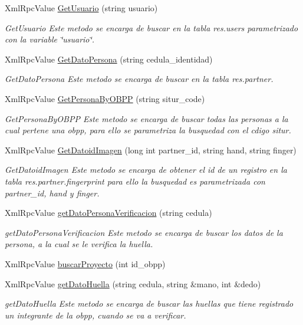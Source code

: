 \begin{DoxyCompactItemize}
Xml\+Rpc\+Value \hyperlink{classGuiWsOpenErp_a417ed5728168fa74561efd022a42ae49}{Get\+Usuario} (string usuario)
\begin{DoxyCompactList}\small\item\em Get\+Usuario Este metodo se encarga de buscar en la tabla res.\+users parametrizado con la variable \char`\"{}usuario\char`\"{}. \end{DoxyCompactList}\item 
Xml\+Rpc\+Value \hyperlink{classGuiWsOpenErp_ae6d4fbf9fa54b3ab177f541dcb15b64f}{Get\+Dato\+Persona} (string cedula\+\_\+identidad)
\begin{DoxyCompactList}\small\item\em Get\+Dato\+Persona Este metodo se encarga de buscar en la tabla res.\+partner. \end{DoxyCompactList}\item 
Xml\+Rpc\+Value \hyperlink{classGuiWsOpenErp_aeb56055280e6dcceb9b3da722c20a5ce}{Get\+Persona\+By\+O\+B\+PP} (string situr\+\_\+code)
\begin{DoxyCompactList}\small\item\em Get\+Persona\+By\+O\+B\+PP Este metodo se encarga de buscar todas las personas a la cual pertene una obpp, para ello se parametriza la busquedad con el cdigo situr. \end{DoxyCompactList}\item 
Xml\+Rpc\+Value \hyperlink{classGuiWsOpenErp_ac8f72cfebf3c98364303d4851752fbf6}{Get\+Datoid\+Imagen} (long int partner\+\_\+id, string hand, string finger)
\begin{DoxyCompactList}\small\item\em Get\+Datoid\+Imagen Este metodo se encarga de obtener el id de un registro en la tabla res.\+partner.\+fingerprint para ello la busquedad es parametrizada con partner\+\_\+id, hand y finger. \end{DoxyCompactList}\item 
Xml\+Rpc\+Value \hyperlink{classGuiWsOpenErp_a128600b86f70773fb336c6b59c853b42}{get\+Dato\+Persona\+Verificacion} (string cedula)
\begin{DoxyCompactList}\small\item\em get\+Dato\+Persona\+Verificacion Este metodo se encarga de buscar los datos de la persona, a la cual se le verifica la huella. \end{DoxyCompactList}\item 
Xml\+Rpc\+Value \hyperlink{classGuiWsOpenErp_a331ff67a1bff59ac435a372fbd08b04b}{buscar\+Proyecto} (int id\+\_\+obpp)
\item 
Xml\+Rpc\+Value \hyperlink{classGuiWsOpenErp_a96d20089ae0aa7b9c262c23d66956274}{get\+Dato\+Huella} (string cedula, string \&mano, int \&dedo)
\begin{DoxyCompactList}\small\item\em get\+Dato\+Huella Este metodo se encarga de buscar las huellas que tiene registrado un integrante de la obpp, cuando se va a verificar. \end{DoxyCompactList}\end{DoxyCompactItemize}
